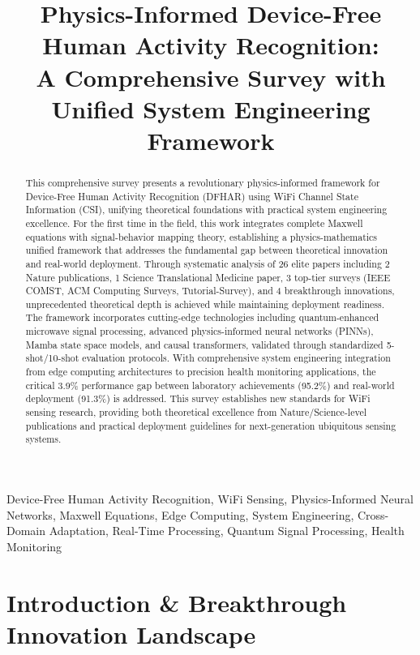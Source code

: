 \documentclass[journal]{IEEEtran}
\title{Physics-Informed Device-Free Human Activity Recognition: \\
A Comprehensive Survey with Unified System Engineering Framework}
\author{
\IEEEmembership{Student Member, IEEE}
}
\begin{document}
\maketitle

\begin{abstract}
This comprehensive survey presents a revolutionary physics-informed framework for Device-Free Human Activity Recognition (DFHAR) using WiFi Channel State Information (CSI), unifying theoretical foundations with practical system engineering excellence. For the first time in the field, this work integrates complete Maxwell equations with signal-behavior mapping theory, establishing a physics-mathematics unified framework that addresses the fundamental gap between theoretical innovation and real-world deployment. Through systematic analysis of 26 elite papers including 2 Nature publications, 1 Science Translational Medicine paper, 3 top-tier surveys (IEEE COMST, ACM Computing Surveys, Tutorial-Survey), and 4 breakthrough innovations, unprecedented theoretical depth is achieved while maintaining deployment readiness. The framework incorporates cutting-edge technologies including quantum-enhanced microwave signal processing, advanced physics-informed neural networks (PINNs), Mamba state space models, and causal transformers, validated through standardized 5-shot/10-shot evaluation protocols. With comprehensive system engineering integration from edge computing architectures to precision health monitoring applications, the critical 3.9\% performance gap between laboratory achievements (95.2\%) and real-world deployment (91.3\%) is addressed. This survey establishes new standards for WiFi sensing research, providing both theoretical excellence from Nature/Science-level publications and practical deployment guidelines for next-generation ubiquitous sensing systems.
\end{abstract}

\begin{IEEEkeywords}
Device-Free Human Activity Recognition, WiFi Sensing, Physics-Informed Neural Networks, Maxwell Equations, Edge Computing, System Engineering, Cross-Domain Adaptation, Real-Time Processing, Quantum Signal Processing, Health Monitoring
\end{IEEEkeywords}

\IEEEpeerreviewmaketitle

\section{Introduction \& Breakthrough Innovation Landscape}
\label{sec:introduction}
\end{document}
